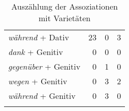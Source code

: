 \begin{table}
\begin{tabular}{lrrr}
\rowcolor[HTML]{C0C0C0} 
\textit{während} + Dativ   & 23 & 0                                                                                                             & 3                                                                                                                                                                                                                                        \\ %
\textit{dank} + Genitiv     & 0 & 0                                                                                                             & 0                                                                                                                                                                                                                                       \\ %
\textit{gegenüber} + Genitiv & 0 & 1                                                                                                             & 0                                                                                                                                                                                                                                        \\ %
\textit{wegen} + Genitiv    & 0 & 3                                                                                                             & 2                                                                                                                                                                                                                                       \\ %
\textit{während} + Genitiv  & 0 & 3                                                                                                             & 0                                                                                                                                                                                                                                        \\\lspbottomrule
\end{tabular}
\caption{Auszählung der Assoziationen mit Varietäten}
\label{table:AssVarietaet}
\end{table}

